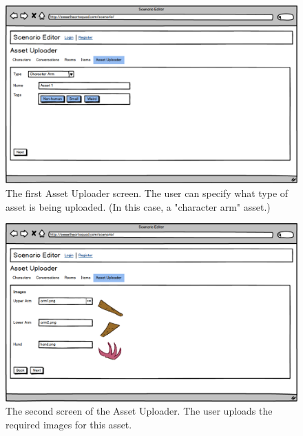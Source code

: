 \begin{figure}[H]
\centering\includegraphics[width=0.95\linewidth, height=0.7\paperheight, keepaspectratio=true]{images/AssetUploader_Arm1}
  \caption{The first Asset Uploader screen. The user can specify what type of asset is being uploaded. (In this case, a "character arm" asset.)}
  \label{fig:mockup_asset_1}
\end{figure}

\begin{figure}[p]
\centering\includegraphics[width=0.95\linewidth, height=0.7\paperheight, keepaspectratio=true]{images/AssetUploader_Arm2}
  \caption{The second screen of the Asset Uploader. The user uploads the required images for this asset.}
  \label{fig:mockup_asset_2}
\end{figure}

